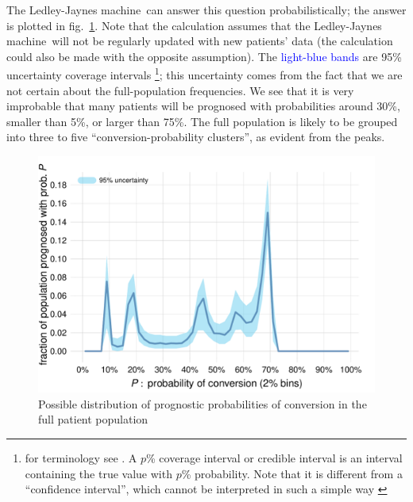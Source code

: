 \documentclass[utf8]{FrontiersinHarvard} %
\newcommand*{\sect}{\S}%
\newcommand*{\fig}{fig.}%
\renewcommand*{\|}[1][]{\nonscript\:#1\vert\nonscript\:\mathopen{}}
\newcommand*{\ljm}{Ledley-Jaynes machine}
\begin{document}
The \ljm\ can answer this question probabilistically; the answer is plotted in \fig~\ref{fig:progn_probs}. Note that the calculation assumes that the \ljm\ will not be regularly updated with new patients' data (the calculation could also be made with the opposite assumption). The \textcolor{blue}{light-blue bands} are 95\% uncertainty coverage intervals \footnote{for terminology see \citet[C.2.30]{jcgm1993_r2008}. A $p$\% coverage interval or credible interval is an interval containing the true value with $p$\% probability. Note that it is different from a \enquote{confidence interval}, which cannot be interpreted in such a simple way \citetext{\citealp[pp.~165--166]{pratt1961}; \citealp{jaynes1976}; \citealp[\sect~37.3]{mackay1995_r2005}}}; this uncertainty comes from the fact that we are not certain about the full-population frequencies. We see that it is very improbable that many patients will be prognosed with probabilities around 30\%, smaller than 5\%, or larger than 75\%. The full population is likely to be grouped into three to five \enquote{conversion-probability clusters}, as evident from the peaks. %
\begin{figure}[b]%
  \centering%
\includegraphics[width=0.75\linewidth]{plotnextpatientconvprob.pdf}%
  \caption{Possible distribution of prognostic probabilities of conversion in the full patient population}\label{fig:progn_probs}
\end{figure}%
\end{document}
